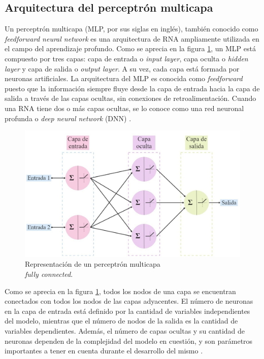 \subsection{Arquitectura del perceptrón multicapa}

Un perceptrón multicapa (MLP, por sus siglas en inglés), también conocido como \emph{feedforward neural network} es 
una arquitectura de RNA ampliamente utilizada en el campo del aprendizaje profundo. Como se aprecia en la figura \ref{fig:MLP}, 
un MLP está compuesto por tres capas: capa de entrada o \emph{input layer}, capa oculta 
o \emph{hidden layer} y capa de salida o \emph{output layer}. 
A su vez, cada capa está formada por neuronas artificiales. La arquitectura del MLP es conocida como \emph{feedforward} 
puesto que la información siempre fluye desde la capa de entrada hacia la capa de salida a través de las capas ocultas, 
sin conexiones de retroalimentación. Cuando una RNA tiene dos o más capas ocultas, se lo conoce como una red neuronal 
profunda o \emph{deep neural network} (DNN) \citep{CITE:35} \citep{CITE:44}. 

\begin{figure}[h!]
	\centering
	\includegraphics[width=\textwidth]{./Figures/MLP.jpg}
	\caption{Representación de un perceptrón multicapa \\ \emph{fully connected}.}
	\label{fig:MLP}
\end{figure}

Como se aprecia en la figura \ref{fig:MLP}, todos los nodos de una capa se encuentran conectados con todos los nodos de las 
capas adyacentes. El número de neuronas en la capa de entrada está definido por la cantidad de variables independientes 
del modelo, mientras que el número de nodos de la salida es la cantidad de variables dependientes. Además, el número de 
capas ocultas y su cantidad de neuronas dependen de la complejidad del modelo en cuestión, y son parámetros importantes 
a tener en cuenta durante el desarrollo del mismo \citep{CITE:42}.


